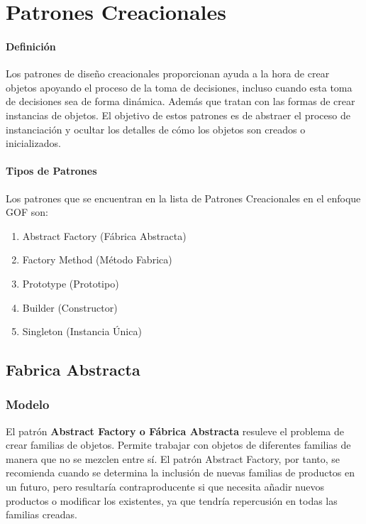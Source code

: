 \section{Patrones Creacionales}
\paragraph{Definición}
Los patrones de diseño creacionales proporcionan ayuda a la hora de crear objetos apoyando el proceso de la toma de decisiones, incluso cuando esta toma de decisiones sea de forma dinámica. Además que tratan con las formas de crear instancias de objetos. El objetivo de estos patrones es de abstraer el proceso de instanciación y ocultar los detalles de cómo los objetos son creados o inicializados.
\paragraph{Tipos de Patrones}
Los patrones que se encuentran en la lista de Patrones Creacionales en el enfoque GOF son:
\begin{enumerate}
	\item Abstract Factory (Fábrica Abstracta)
	\item Factory Method (Método Fabrica)
	\item Prototype (Prototipo)
	\item Builder (Constructor)
	\item Singleton (Instancia Única)
\end{enumerate}


\subsection{Fabrica Abstracta}
\subsubsection{Modelo}

El patrón \textbf{Abstract Factory o Fábrica Abstracta} resuleve el problema de crear familias de objetos. Permite trabajar con objetos de diferentes familias de manera que no se mezclen entre sí. El patrón Abstract Factory, por tanto, se recomienda cuando se determina la inclusión de nuevas familias de productos en un futuro, pero resultaría contraproducente si que necesita añadir nuevos productos o modificar los existentes, ya que tendría repercusión en todas las familias creadas.

